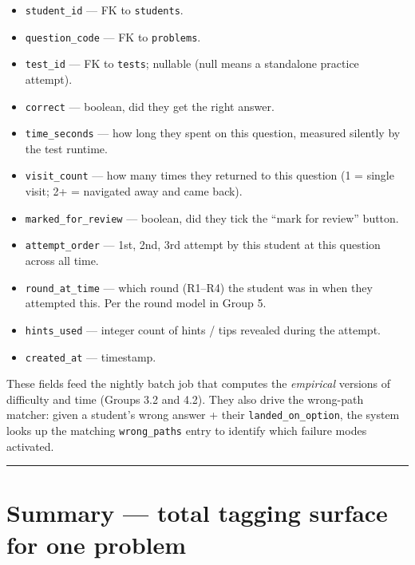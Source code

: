 \documentclass[11pt,letterpaper]{article}
\newcommand{\cd}[1]{\texttt{\small #1}}
\begin{document}
\begin{itemize}\itemsep0em
\item \cd{student\_id} --- FK to \cd{students}.
\item \cd{question\_code} --- FK to \cd{problems}.
\item \cd{test\_id} --- FK to \cd{tests}; nullable (null means a standalone practice attempt).
\item \cd{correct} --- boolean, did they get the right answer.
\item \cd{time\_seconds} --- how long they spent on this question, measured silently by the test runtime.
\item \cd{visit\_count} --- how many times they returned to this question (1 = single visit; 2+ = navigated away and came back).
\item \cd{marked\_for\_review} --- boolean, did they tick the ``mark for review'' button.
\item \cd{attempt\_order} --- 1st, 2nd, 3rd attempt by this student at this question across all time.
\item \cd{round\_at\_time} --- which round (R1--R4) the student was in when they attempted this. Per the round model in Group 5.
\item \cd{hints\_used} --- integer count of hints / tips revealed during the attempt.
\item \cd{created\_at} --- timestamp.
\end{itemize}

These fields feed the nightly batch job that computes the \emph{empirical} versions of difficulty and time (Groups 3.2 and 4.2). They also drive the wrong-path matcher: given a student's wrong answer + their \cd{landed\_on\_option}, the system looks up the matching \cd{wrong\_paths} entry to identify which failure modes activated.

\bigskip\hrule\bigskip

\section*{Summary --- total tagging surface for one problem}
\end{document}

